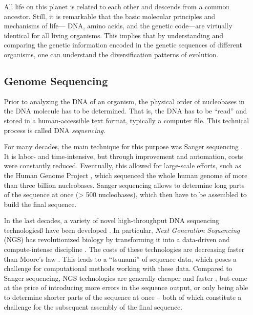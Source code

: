 All life on this planet is related to each other and descends from a common ancestor.
Still, it is remarkable that the basic molecular principles and mechanisms of life---%
DNA, amino acids, and the genetic code---are virtually identical for all living organisms.
This implies that by understanding and comparing the genetic information
encoded in the genetic sequences of different organisms,
one can understand the diversification patterns of evolution.


\subsection{Genome Sequencing}
\label{ch:Foundations:sec:SequenceAnalysis:sub:GenomeSequencing}

Prior to analyzing the DNA of an organism, the physical order of nucleobases in the DNA molecule has to be determined.
That is, the DNA has to be ``read'' and stored in a human-accessible text format, typically a computer file.
This technical process is called DNA \emph{sequencing}.

For many decades, the main technique for this purpose was Sanger sequencing \cite{Sanger1975,Sanger1977}.
It is labor- and time-intensive, but through improvement and automation, costs were constantly reduced.
Eventually, this allowed for large-scale efforts, such as the Human Genome Project \cite{Venter2001},
which sequenced the whole human genome of more than three billion nucleobases.
Sanger sequencing allows to determine long parts of the sequence at once (> \num{500} nucleobases),
which then have to be assembled to build the final sequence.

In the last decades, a variety of novel high-throughput DNA sequencing technologiesß
have been developed \cite{Pettersson2009,Reuter2015,Goodwin2016}.
In particular, \emph{Next Generation Sequencing} (NGS) \cite{Logares2012,Mardis2013}
has revolutionized biology by transforming it into a data-driven and compute-intense discipline \citep{Escobar-Zepeda2015}.
The costs of these technologies are decreasing faster than Moore's law \cite{Wetterstrand2018}.
This leads to a ``tsunami'' of sequence data,
which poses a challenge for computational methods working with these data.
Compared to Sanger sequencing, NGS technologies are generally cheaper and faster \cite{Voelkerding2009,Metzker2010},
but come at the price of introducing more errors in the sequence output,
or only being able to determine shorter parts of the sequence at once
-- both of which constitute a challenge for the subsequent assembly of the final sequence.

